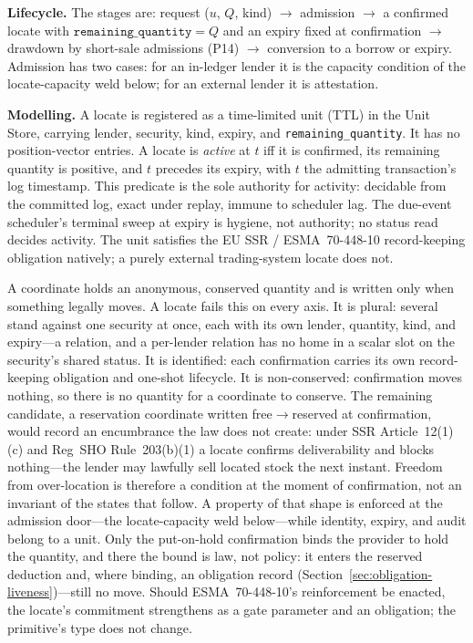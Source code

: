 \noindent\textbf{Lifecycle.} The stages are: request ($u$, $Q$, kind) $\to$ admission $\to$ a confirmed locate with $\texttt{remaining\_quantity}=Q$ and an expiry fixed at confirmation $\to$ drawdown by short-sale admissions (P14) $\to$ conversion to a borrow or expiry. Admission has two cases: for an in-ledger lender it is the capacity condition of the locate-capacity weld below; for an external lender it is attestation.

\noindent\textbf{Modelling.} A locate is registered as a time-limited unit (TTL) in the Unit Store, carrying lender, security, kind, expiry, and \texttt{remaining\_quantity}. It has no position-vector entries. A locate is \emph{active} at $t$ iff it is confirmed, its remaining quantity is positive, and $t$ precedes its expiry, with $t$ the admitting transaction's log timestamp. This predicate is the sole authority for activity: decidable from the committed log, exact under replay, immune to scheduler lag. The due-event scheduler's terminal sweep at expiry is hygiene, not authority; no status read decides activity. The unit satisfies the EU SSR / ESMA~70-448-10 record-keeping obligation natively; a purely external trading-system locate does not.

\begin{remark}
\label{rem:locate-unit}
A coordinate holds an anonymous, conserved quantity and is written only when something legally moves. A locate fails this on every axis. It is plural: several stand against one security at once, each with its own lender, quantity, kind, and expiry---a relation, and a per-lender relation has no home in a scalar slot on the security's shared status. It is identified: each confirmation carries its own record-keeping obligation and one-shot lifecycle. It is non-conserved: confirmation moves nothing, so there is no quantity for a coordinate to conserve. The remaining candidate, a reservation coordinate written free$\to$reserved at confirmation, would record an encumbrance the law does not create: under SSR Article~12(1)(c) and Reg~SHO Rule~203(b)(1) a locate confirms deliverability and blocks nothing---the lender may lawfully sell located stock the next instant. Freedom from over-location is therefore a condition at the moment of confirmation, not an invariant of the states that follow. A property of that shape is enforced at the admission door---the locate-capacity weld below---while identity, expiry, and audit belong to a unit. Only the put-on-hold confirmation binds the provider to hold the quantity, and there the bound is law, not policy: it enters the reserved deduction and, where binding, an obligation record (Section~\ref{sec:obligation-liveness})---still no move. Should ESMA~70-448-10's reinforcement be enacted, the locate's commitment strengthens as a gate parameter and an obligation; the primitive's type does not change.
\end{remark}

